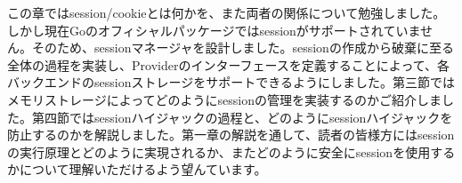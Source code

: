 この章ではsession/cookieとは何かを、また両者の関係について勉強しました。しかし現在Goのオフィシャルパッケージではsessionがサポートされていません。そのため、sessionマネージャを設計しました。sessionの作成から破棄に至る全体の過程を実装し、Providerのインターフェースを定義することによって、各バックエンドのsessionストレージをサポートできるようにしました。第三節ではメモリストレージによってどのようにsessionの管理を実装するのかご紹介しました。第四節ではsessionハイジャックの過程と、どのようにsessionハイジャックを防止するのかを解説しました。第一章の解説を通して、読者の皆様方にはsessionの実行原理とどのように実現されるか、またどのように安全にsessionを使用するかについて理解いただけるよう望んています。
